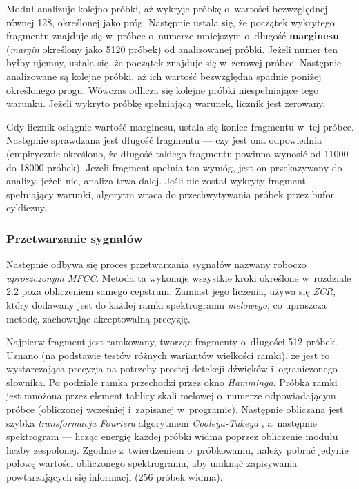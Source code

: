 Moduł analizuje kolejno próbki, aż wykryje próbkę o~wartości bezwzględnej równej 128, określonej jako próg. Następnie ustala się, że początek wykrytego fragmentu znajduje się w~próbce o~numerze mniejszym o~długość \textbf{marginesu} (\textit{margin} określony jako 5120 próbek) od analizowanej próbki. Jeżeli numer ten byłby ujemny, ustala się, że początek znajduje się w~zerowej próbce. Następnie analizowane są kolejne próbki, aż ich wartość bezwzględna spadnie poniżej określonego progu. Wówczas odlicza się kolejne próbki niespełniające tego warunku. Jeżeli wykryto próbkę spełniającą warunek, licznik jest zerowany.

Gdy licznik osiągnie wartość marginesu, ustala się koniec fragmentu w~tej próbce. Następnie sprawdzana jest długość fragmentu — czy jest ona odpowiednia (empirycznie określono, że długość takiego fragmentu powinna wynosić od 11000 do 18000 próbek). Jeżeli fragment spełnia ten wymóg, jest on przekazywany do analizy, jeżeli nie, analiza trwa dalej. Jeśli nie został wykryty fragment spełniający warunki, algorytm wraca do przechwytywania próbek przez bufor cykliczny.



\subsubsection{Przetwarzanie sygnałów}


Następnie odbywa się proces przetwarzania sygnałów nazwany roboczo \textit{uproszczonym MFCC}. Metoda ta wykonuje wszystkie kroki określone w~rozdziale 2.2 poza obliczeniem samego cepstrum. Zamiast jego liczenia, używa się \textit{ZCR}, który dodawany jest do każdej ramki spektrogramu \textit{melowego}, co upraszcza metodę, zachowując akceptowalną precyzję.

Najpierw fragment jest ramkowany, tworząc fragmenty o~długości 512 próbek. Uznano (na podstawie testów różnych wariantów wielkości ramki), że jest to wystarczająca precyzja na potrzeby prostej detekcji dźwięków i~ograniczonego słownika. Po podziale ramka przechodzi przez okno \textit{Hamminga}. Próbka ramki jest mnożona przez element tablicy skali melowej o~numerze odpowiadającym próbce (obliczonej wcześniej i~zapisanej w~programie). Następnie obliczana jest szybka \textit{transformacja Fouriera} algorytmem \textit{Cooleya-Tukeya} \cite{CT:FFT}, a~następnie spektrogram — licząc energię każdej próbki widma poprzez obliczenie modułu liczby zespolonej. Zgodnie z~twierdzeniem o~próbkowaniu, należy pobrać jedynie połowę wartości obliczonego spektrogramu, aby uniknąć zapisywania powtarzających się informacji (256 próbek widma).

